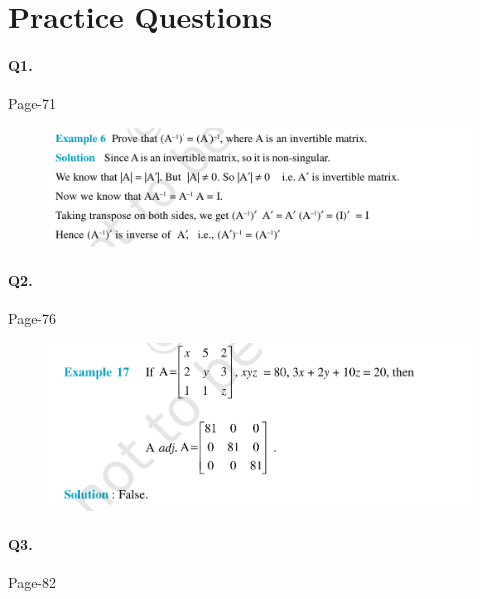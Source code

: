 \documentclass{article}
\begin{document}
\section*{Practice Questions}
\paragraph{Q1.}
\begin{flushright}
Page-71
\end{flushright}

\begin{figure}[H]
    \includegraphics[scale=0.5]{determinants_l3_ps_1.png}
\end{figure}
\paragraph{Q2.}
\begin{flushright}
Page-76
\end{flushright}

\begin{figure}[H]
    \includegraphics[scale=0.5]{determinants_l3_ps_2.png}
\end{figure}

\paragraph{Q3.}
\begin{flushright}
Page-82
\end{flushright}
\end{document}
